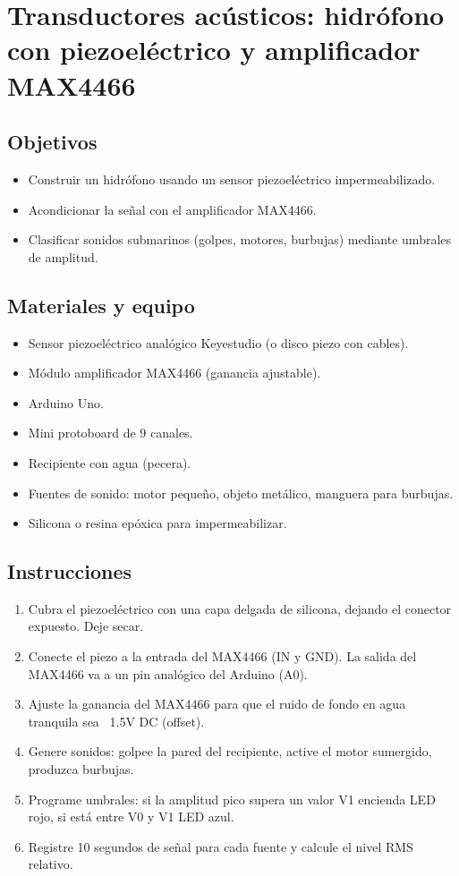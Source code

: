 \chapter{Transductores acústicos: hidrófono con piezoeléctrico y amplificador MAX4466}

\section*{Objetivos}
\begin{itemize}
    \item Construir un hidrófono usando un sensor piezoeléctrico impermeabilizado.
    \item Acondicionar la señal con el amplificador MAX4466.
    \item Clasificar sonidos submarinos (golpes, motores, burbujas) mediante umbrales de amplitud.
\end{itemize}

\section*{Materiales y equipo}
\begin{itemize}
    \item Sensor piezoeléctrico analógico Keyestudio (o disco piezo con cables).
    \item Módulo amplificador MAX4466 (ganancia ajustable).
    \item Arduino Uno.
    \item Mini protoboard de 9 canales.
    \item Recipiente con agua (pecera).
    \item Fuentes de sonido: motor pequeño, objeto metálico, manguera para burbujas.
    \item Silicona o resina epóxica para impermeabilizar.
\end{itemize}

\section*{Instrucciones}
\begin{enumerate}
    \item Cubra el piezoeléctrico con una capa delgada de silicona, dejando el conector expuesto. Deje secar.
    \item Conecte el piezo a la entrada del MAX4466 (IN y GND). La salida del MAX4466 va a un pin analógico del Arduino (A0).
    \item Ajuste la ganancia del MAX4466 para que el ruido de fondo en agua tranquila sea ~1.5V DC (offset).
    \item Genere sonidos: golpee la pared del recipiente, active el motor sumergido, produzca burbujas.
    \item Programe umbrales: si la amplitud pico supera un valor V1 encienda LED rojo, si está entre V0 y V1 LED azul.
    \item Registre 10 segundos de señal para cada fuente y calcule el nivel RMS relativo.
\end{enumerate}

